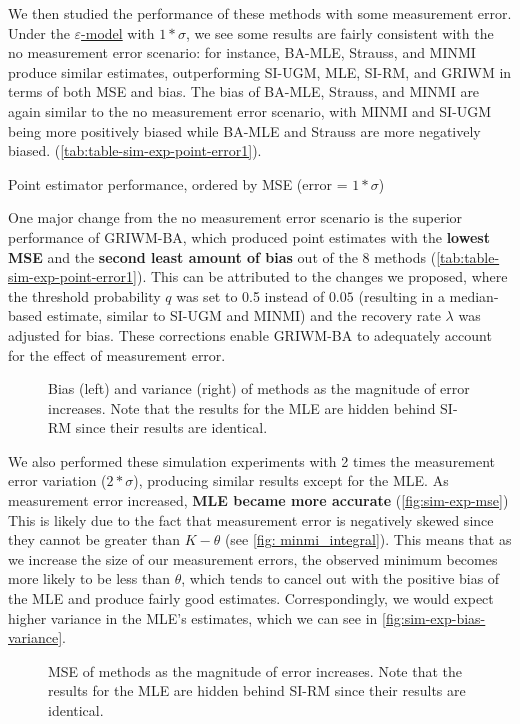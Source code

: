 We then studied the performance of these methods with some measurement error. Under the  \hyperref[model: measurement-error]{$\varepsilon$-model} with $1*\sigma$, we see some results are fairly consistent with the no measurement error scenario: for instance, BA-MLE, Strauss, and MINMI produce similar estimates, outperforming SI-UGM, MLE, SI-RM, and GRIWM in terms of both MSE and bias. The bias of BA-MLE, Strauss, and MINMI are again similar to the no measurement error scenario, with MINMI and SI-UGM being more positively biased while BA-MLE and Strauss are more negatively biased. (\autoref{tab:table-sim-exp-point-error1}).
\begin{table}[ht]
    \centering
    \caption{Point estimator performance, ordered by MSE (error = $1*\sigma$)}
    
    \label{tab:table-sim-exp-point-error1}
\end{table}

One major change from the no measurement error scenario is the superior performance of GRIWM-BA, which produced point estimates with the \textbf{lowest MSE} and the \textbf{second least amount of bias} out of the 8 methods (\autoref{tab:table-sim-exp-point-error1}). This can be attributed to the changes we proposed, where the threshold probability $q$ was set to 0.5 instead of $0.05$ (resulting in a median-based estimate, similar to SI-UGM and MINMI) and the recovery rate $\lambda$ was adjusted for bias. These corrections enable GRIWM-BA to adequately account for the effect of measurement error.
\begin{figure}[ht]
    \centering
    
    \caption{Bias (left) and variance (right) of methods as the magnitude of error increases. Note that the results for the MLE are hidden behind SI-RM since their results are identical.}
    \label{fig:sim-exp-bias-variance}
\end{figure}

We also performed these simulation experiments with 2 times the measurement error variation ($2*\sigma$), producing similar results except for the MLE. As measurement error increased, \textbf{MLE became more accurate} (\autoref{fig:sim-exp-mse}) This is likely due to the fact that measurement error is negatively skewed since they cannot be greater than $K-\theta$ (see \autoref{fig: minmi_integral}). This means that as we increase the size of our measurement errors, the observed minimum becomes more likely to be less than $\theta$, which tends to cancel out with the positive bias of the MLE and produce fairly good estimates. Correspondingly, we would expect higher variance in the MLE's estimates, which we can see in \autoref{fig:sim-exp-bias-variance}.
\begin{figure}[ht]
    \centering
    
    \caption{MSE of methods as the magnitude of error increases. Note that the results for the MLE are hidden behind SI-RM since their results are identical.}
    \label{fig:sim-exp-mse}
\end{figure}

